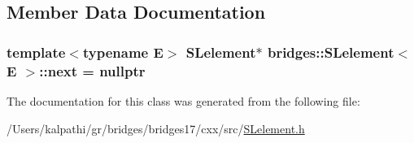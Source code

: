\subsection{Member Data Documentation}
\hypertarget{classbridges_1_1_s_lelement_ad7449d10a09ebc52653a7baed812aa43}{}
\subsubsection[{next}]{\setlength{\rightskip}{0pt plus 5cm}template$<$typename E$>$ {\bf S\+Lelement}$\ast$ {\bf bridges\+::\+S\+Lelement}$<$ E $>$\+::next = nullptr\hspace{0.3cm}{\ttfamily [protected]}}\label{classbridges_1_1_s_lelement_ad7449d10a09ebc52653a7baed812aa43}


The documentation for this class was generated from the following file\+:\begin{DoxyCompactItemize}
\item 
/\+Users/kalpathi/gr/bridges/bridges17/cxx/src/\hyperlink{_s_lelement_8h}{S\+Lelement.\+h}\end{DoxyCompactItemize}
